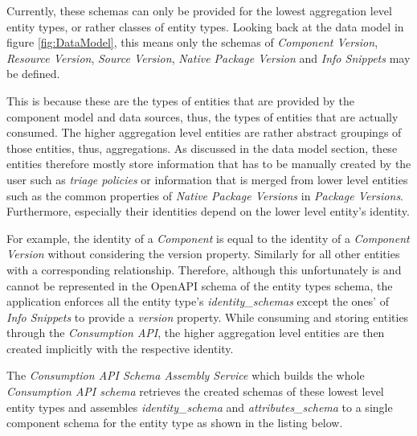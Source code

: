 Currently, these schemas can only be provided for the lowest aggregation level entity types, or rather classes of entity types. Looking back at the data model in figure \ref{fig:DataModel}, this means only the schemas of \emph{Component Version}, \emph{Resource Version}, \emph{Source Version}, \emph{Native Package Version} and \emph{Info Snippets} may be defined.\par 
This is because these are the types of entities that are provided by the component model and data sources, thus, the types of entities that are actually consumed. The higher aggregation level entities are rather abstract groupings of those entities, thus, aggregations. As discussed in the data model section, these entities therefore mostly store information that has to be manually created by the user such as \emph{triage policies} or information that is merged from lower level entities such as the common properties of \emph{Native Package Versions} in \emph{Package Versions}. Furthermore, especially their identities depend on the lower level entity's identity.\par
For example, the identity of a \emph{Component} is equal to the identity of a \emph{Component Version} without considering the version property. Similarly for all other entities with a corresponding relationship. Therefore, although this unfortunately is and cannot be represented in the OpenAPI schema of the entity types schema, the application enforces all the entity type's \emph{identity\_schemas} except the ones' of \emph{Info Snippets} to provide a \emph{version} property. While consuming and storing entities through the \emph{Consumption API}, the higher aggregation level entities are then created implicitly with the respective identity.\par
The \emph{Consumption API Schema Assembly Service} which builds the whole \emph{Consumption API schema} retrieves the created schemas of these lowest level entity types and assembles \emph{identity\_schema} and \emph{attributes\_schema} to a single component schema for the entity type as shown in the listing below.

